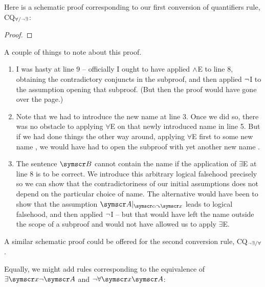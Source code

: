  Here is a schematic proof corresponding to our first conversion of quantifiers rule, CQ$_{\forall/\neg\exists}$:
\begin{proof}
	\open
		\open
			\open
		\close
		\close
		\close
\end{proof}
A couple of things to note about this proof. \begin{enumerate}
\item I was hasty at line 9 – officially I ought to have applied $\wedge$E to line 8, obtaining the contradictory conjuncts in the subproof, and then applied $\neg$I to the assumption opening that subproof. (But then the proof would have gone over the page.)
\item Note that we had to introduce the new name  at line 3. Once we did so, there was no obstacle to applying $\forall$E on that newly introduced name in line 5. But if we had done things the other way around, applying $\forall$E first to some new name , we would have had to open the subproof with yet another new name . 
	\item The sentence $\meta{B}$ cannot contain the name  if the application of $\exists$E at line 8 is to be correct. We introduce this arbitrary logical falsehood precisely so we can show that the contradictoriness of our initial assumptions does not depend on the particular choice of name. The alternative would have been to show that the assumption $\meta{A}\subs{\meta{c}}{\meta{x}}$ leads to logical falsehood, and then applied $\neg$I – but that would have left the name  outside the scope of a subproof and would not have allowed us to apply $\exists$E.
\end{enumerate}

A similar schematic proof could be offered for the second conversion rule, CQ$_{\neg\exists/\forall}$.

Equally, we might add rules corresponding to the equivalence of $\exists\meta{x}\enot\meta{A}$ and $\enot\forall\meta{x}\meta{A}$:

